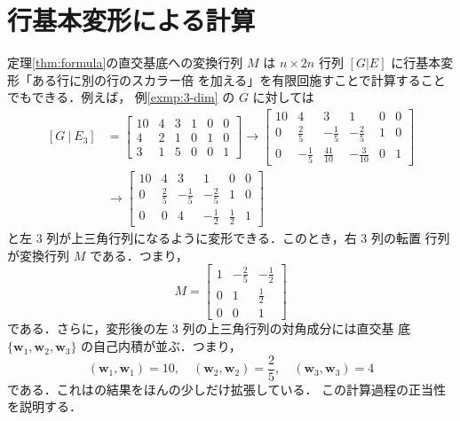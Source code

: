 \documentclass[11pt, uplatex, dvipdfmx]{jsarticle}
\theoremstyle{definition}
\begin{document}
\section{行基本変形による計算}


定理\ref{thm:formula}の直交基底への変換行列 $M$ は $n \times
2n$ 行列 $\left[ G | E\right]$ に行基本変形「ある行に別の行のスカラー倍
を加える」を有限回施すことで計算することでもできる．例えば，
例\ref{exmp:3-dim} の $G$ に対しては
\[
  \begin{aligned}
    \left[ G \ | \ E_3\right]  & =\left[
      \begin{array}{rrr|rrr}
        10 & 4 & 3 & 1 & 0 & 0\\
        4 & 2 & 1 & 0 & 1 & 0\\
        3 & 1 & 5 & 0 & 0 & 1
      \end{array}
    \right]   \to  \left[
      \begin{array}{rrr|rrr}
        10 & 4 & 3 & 1 & 0 & 0\\
        0 & \frac{2}{5} & -\frac{1}{5} & -\frac{2}{5} & 1 & 0\\
        0 & -\frac{1}{5} & \frac{41}{10} & -\frac{3}{10} & 0 & 1
      \end{array}
    \right]\\
    &\to \left[
      \begin{array}{rrr|rrr}
        10 & 4 & 3 & 1 & 0 & 0\\
        0 & \frac{2}{5} & -\frac{1}{5} & -\frac{2}{5} & 1 & 0\\
        0 & 0 & 4 & -\frac{1}{2} & \frac{1}{2} & 1
      \end{array}
\right]
  \end{aligned}
\]
と左 $3$ 列が上三角行列になるように変形できる．このとき，右 $3$ 列の転置
行列が変換行列 $M$ である．つまり，
\[
  M = \left[
    \begin{array}{rrr}
      1 & -\frac{2}{5} & -\frac{1}{2}\\
      0 & 1 & \frac{1}{2}\\
      0 & 0 & 1
    \end{array}
  \right]
\]
である．さらに，変形後の左 $3$ 列の上三角行列の対角成分には直交基
底 $\{\bm{w}_1, \bm{w}_2, \bm{w}_3\}$ の自己内積が並ぶ．つまり，
\[
  (\bm{w}_1, \bm{w}_1) = 10, \quad (\bm{w}_2, \bm{w}_2) = \frac{2}{5}, \quad
  (\bm{w}_3, \bm{w}_3) = 4
\]
である．これは\cite{gauss}の結果をほんの少しだけ拡張している．
この計算過程の正当性を説明する．\\
\end{document}
